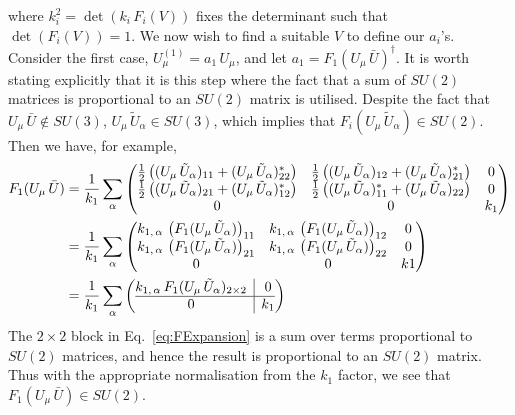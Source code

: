 %
where $k_i^2 = \det(k_i\, F_i(V))$ fixes the determinant such that $\det(F_i(V))=1$.
We now wish to find a suitable $V$ to define our $a_i$'s. Consider the first case, $U^{(1)}_\mu = a_1\,U_\mu$, and let $a_1 = F_1(U_\mu\,\bar{U})^\dagger$. It is worth stating explicitly that it is this step where the fact that a sum of $SU(2)$ matrices is proportional to an $SU(2)$ matrix is utilised. Despite the fact that $U_\mu\,\bar{U} \notin SU(3)$, $U_\mu \, \tilde{U}_\alpha\in SU(3)$, which implies that $F_i(U_\mu\, \tilde{U}_\alpha)\in SU(2)$. Then we have, for example,
%
\begin{align}
F_1(U_\mu \, \bar{U}) &= \frac{1}{k_1}\sum_\alpha
\begin{pmatrix}
\frac{1}{2}\left((U_\mu \, \tilde{U}_\alpha)_{11} + (U_\mu \, \tilde{U}_\alpha)^*_{22}\right) & \frac{1}{2}\left((U_\mu \, \tilde{U}_\alpha)_{12} + (U_\mu \, \tilde{U}_\alpha)^*_{21}\right) & 0\\
\frac{1}{2}\left((U_\mu \, \tilde{U}_\alpha)_{21} + (U_\mu \, \tilde{U}_\alpha)^*_{12}\right) & \frac{1}{2}\left((U_\mu \, \tilde{U}_\alpha)^*_{11} + (U_\mu \, \tilde{U}_\alpha)_{22}\right) & 0\\
0 & 0 & k_1
\end{pmatrix}\nonumber\\
&=\frac{1}{k_1}\sum_\alpha
\begin{pmatrix}
k_{1,\,\alpha}\,\left(F_1(U_\mu\,\tilde{U}_\alpha)\right)_{11} & k_{1,\,\alpha}\,\left(F_1(U_\mu\,\tilde{U}_\alpha)\right)_{12} & 0\\
k_{1,\,\alpha}\,\left(F_1(U_\mu\,\tilde{U}_\alpha)\right)_{21} & k_{1,\,\alpha}\,\left(F_1(U_\mu\,\tilde{U}_\alpha)\right)_{22} & 0\\
0 & 0 & k1
\end{pmatrix}\nonumber\\
&=\frac{1}{k_1}\sum_\alpha
\left(\begin{array}{@{}c|c@{}}
k_{1,\,\alpha} \,F_1(U_\mu\,\tilde{U}_\alpha)_{2\times 2} & 0\\
  \hline 
0 & k_1
\end{array}\right)
\label{eq:FExpansion}
\end{align}
%
The $2\times 2$ block in Eq.~\ref{eq:FExpansion} is a sum over terms proportional to $SU(2)$ matrices, and hence the result is proportional to an $SU(2)$ matrix. Thus with the appropriate normalisation from the $k_1$ factor, we see that $F_1(U_\mu \, \bar{U})\in SU(2)$.\\

